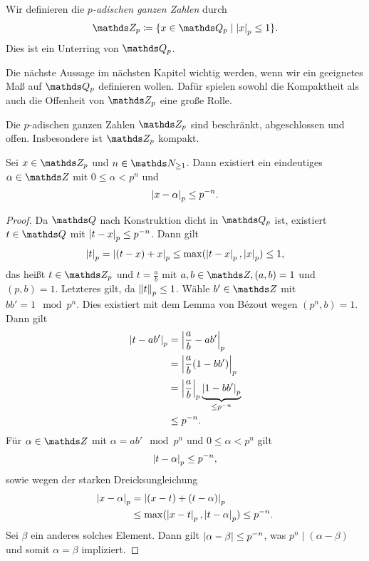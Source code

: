 \begin{defi}
Wir definieren die \emph{$p$-adischen ganzen Zahlen} durch
\begin{align*}
\Z_p\coloneqq \{x\in \Q_p \mid \abs{x}_p \leq 1\}.
\end{align*}
Dies ist ein Unterring von $\Q_p$.
\end{defi}

Die nächste Aussage im nächsten Kapitel wichtig werden, wenn wir ein geeignetes Maß auf $\Q_p$ definieren wollen.
Dafür spielen sowohl die Kompaktheit als auch die Offenheit von $\Z_p$ eine große Rolle.

\begin{satz}
Die $p$-adischen ganzen Zahlen $\Z_p$ sind beschränkt, abgeschlossen und offen.
Insbesondere ist $\Z_p$ kompakt.
\end{satz}

\begin{satz}
Sei $x\in \Z_p$ und $n\in \N_{\geq 1}$.
Dann existiert ein eindeutiges $\alpha \in \Z$ mit $0\leq \alpha <p^n$ und
\begin{align*}
\left\vert x-\alpha\right\vert_p\leq p^{-n}.
\end{align*}
\begin{proof}
Da $\Q$ nach Konstruktion dicht in $\Q_p$ ist, existiert $t \in \Q$ mit $\left\vert t-x\right\vert_p \leq p^{-n}$.
Dann gilt
\begin{align*}
\left\vert t\right\vert_p=\left\vert(t-x)+x\right\vert_p \leq \max(\left\vert t-x\right\vert_p,\left\vert x\right\vert_p) \leq 1,
\end{align*}
das heißt $t \in \Z_p$ und $t=\frac{a}{b}$ mit $a,b\in \Z, (a,b)=1$ und $(p,b)=1$. Letzteres gilt, da $\left\lVert t\right\rVert_p\leq 1$. 
Wähle $b'\in \Z$ mit $bb'=1 \mod p^n$. Dies existiert mit dem Lemma von Bézout wegen $(p^n,b)=1$.
Dann gilt
\begin{align*}
\left\vert t-ab'\right\vert_p&=\left\vert\frac{a}{b}-ab'\right\vert_p\\
&=\left\vert\frac{a}{b}(1-bb')\right\vert_p\\
&=\left\vert\frac{a}{b}\right\vert_p \underbrace{\left\vert1-bb'\right\vert_p}_{\leq p^{-n}}\\
&\leq p^{-n}.
\end{align*}
Für $\alpha \in \Z$ mit $\alpha=ab' \mod p^n$ und $0 \leq \alpha <p^n$ gilt
\begin{align*}
\left\vert t-\alpha\right\vert_p\leq p^{-n},
\end{align*}
sowie wegen der starken Dreicksungleichung
\begin{align*}
\left\vert x-\alpha\right\vert_p &=\left\vert(x-t)+(t-\alpha)\right\vert_p\\
&\leq \max (\left\vert x-t\right\vert_p,\left\vert t-\alpha\right\vert_p)\leq p^{-n}.
\end{align*}
Sei $\beta$ ein anderes solches Element. Dann gilt $\left\vert\alpha-\beta\right\vert\leq p^{-n}$, was $p^n\mid (\alpha-\beta)$ und somit $\alpha=\beta$ impliziert.
\end{proof}
\end{satz}

